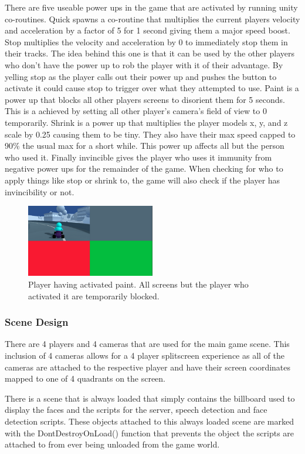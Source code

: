 \documentclass[a4paper,10pt]{article}
\begin{document}
There are five useable power ups in the game that are activated by running unity co-routines. Quick spawns a co-routine that multiplies the current players velocity and acceleration by a factor of 5 for 1 second giving them a major speed boost. Stop multiplies the velocity and acceleration by 0 to immediately stop them in their tracks. The idea behind this one is that it can be used by the other players who don't have the power up to rob the player with it of their advantage. By yelling stop as the player calls out their power up and pushes the button to activate it could cause stop to trigger over what they attempted to use. Paint is a power up that blocks all other players screens to disorient them for 5 seconds. This is a achieved by setting all other player's camera's field of view to 0 temporarily. Shrink is a power up that multiplies the player models x, y, and z scale by 0.25 causing them to be tiny. They also have their max speed capped to 90\% the usual max for a short while. This power up affects all but the person who used it. Finally invincible gives the player who uses it immunity from negative power ups for the remainder of the game. When checking for who to apply things like stop or shrink to, the game will also check if the player has invincibility or not. 

\begin{figure}[H]
  \centering
      \includegraphics[width=0.5\textwidth]{Assets/Paint.png}
  \caption{Player having activated paint. All screens but the player who activated it are temporarily blocked.}
\end{figure}

\subsubsection{Scene Design}
There are 4 players and 4 cameras that are used for the main game scene. This inclusion of 4 cameras allows for a 4 player splitscreen experience as all of the cameras are attached to the respective player and have their screen coordinates mapped to one of 4 quadrants on the screen.

There is a scene that is always loaded that simply contains the billboard used to display the faces and the scripts for the server, speech detection and face detection scripts. These objects attached to this always loaded scene are marked with the DontDestroyOnLoad() function that prevents the object the scripts are attached to from ever being unloaded from the game world.
\end{document}
